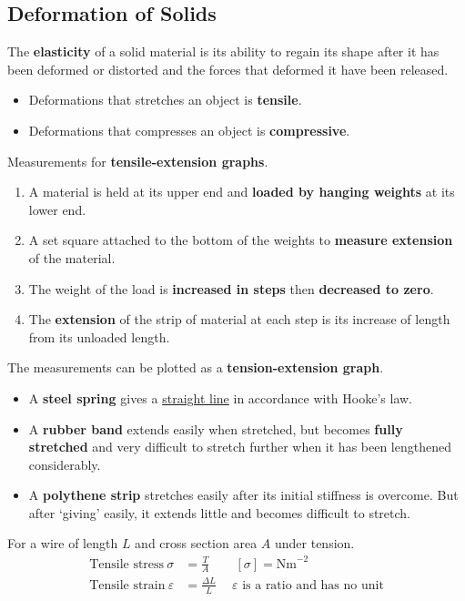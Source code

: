 \subsection{Deformation of Solids}

The \textbf{elasticity} of a solid material is its ability to regain its shape after it has been deformed or distorted and the forces that deformed it have been released.
\begin{itemize}
    \item Deformations that stretches an object is \textbf{tensile}.
    \item Deformations that compresses an object is \textbf{compressive}.
\end{itemize}

Measurements for \textbf{tensile-extension graphs}.
\begin{enumerate}
    \item A material is held at its upper end and \textbf{loaded by hanging weights} at its lower end.
    \item A set square attached to the bottom of the weights to \textbf{measure extension} of the material.
    \item The weight of the load is \textbf{increased in steps} then \textbf{decreased to zero}.
    \item The \textbf{extension} of the strip of material at each step is its increase of length from its unloaded length.
\end{enumerate}
The measurements can be plotted as a \textbf{tension-extension graph}.
\begin{itemize}
    \item A \textbf{steel spring} gives a \underline{straight line} in accordance with Hooke's law.
    \item A \textbf{rubber band} extends easily when stretched, but becomes \textbf{fully stretched} and very difficult to stretch further when it has been lengthened considerably.
    \item A \textbf{polythene strip} stretches easily after its initial stiffness is overcome. But after `giving' easily, it extends little and becomes difficult to stretch.
\end{itemize}

For a wire of length $L$ and cross section area $A$ under tension.
\begin{align*}
    \text{Tensile stress}\ \sigma&=\frac{T}{A}\qquad[\sigma]=\text{Nm}^{-2}\\
    \text{Tensile strain}\ \varepsilon&=\frac{\Delta L}{L}\quad\ \text{$\varepsilon$ is a ratio and has no unit}
\end{align*}

